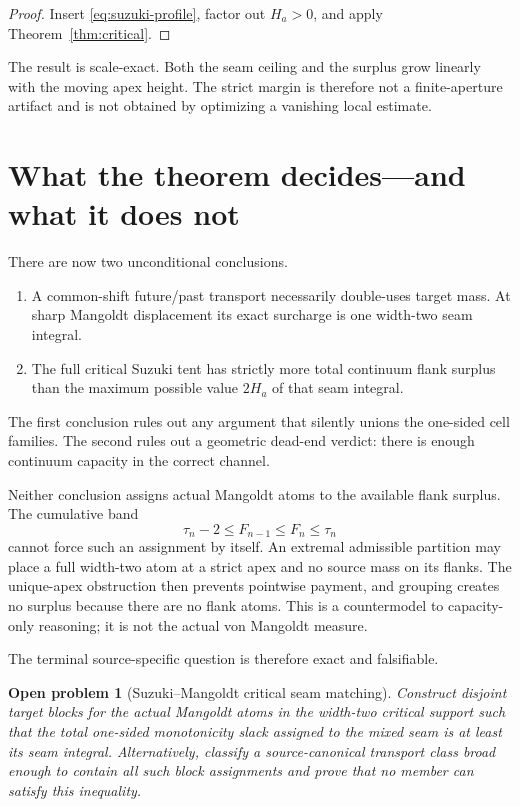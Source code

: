 \documentclass[11pt]{article}
\newtheorem{problem}[theorem]{Open problem}
\begin{document}
\begin{proof}
Insert \eqref{eq:suzuki-profile}, factor out $H_a>0$, and apply
Theorem~\ref{thm:critical}.
\end{proof}

The result is scale-exact.  Both the seam ceiling and the surplus grow linearly with the moving
apex height.  The strict margin is therefore not a finite-aperture artifact and is not obtained by
optimizing a vanishing local estimate.

\section{What the theorem decides---and what it does not}

There are now two unconditional conclusions.

\begin{enumerate}
\item A common-shift future/past transport necessarily double-uses target mass.  At sharp
Mangoldt displacement its exact surcharge is one width-two seam integral.
\item The full critical Suzuki tent has strictly more total continuum flank surplus than the
maximum possible value $2H_a$ of that seam integral.
\end{enumerate}

The first conclusion rules out any argument that silently unions the one-sided cell families.
The second rules out a geometric dead-end verdict: there is enough continuum capacity in the
correct channel.

Neither conclusion assigns actual Mangoldt atoms to the available flank surplus.  The cumulative
band
\[
 \tau_n-2\le F_{n-1}\le F_n\le\tau_n
\]
cannot force such an assignment by itself.  An extremal admissible partition may place a full
width-two atom at a strict apex and no source mass on its flanks.  The unique-apex obstruction then
prevents pointwise payment, and grouping creates no surplus because there are no flank atoms.  This
is a countermodel to capacity-only reasoning; it is not the actual von Mangoldt measure.

The terminal source-specific question is therefore exact and falsifiable.

\begin{problem}[Suzuki--Mangoldt critical seam matching]\label{prob:matching}
Construct disjoint target blocks for the actual Mangoldt atoms in the width-two critical support
such that the total one-sided monotonicity slack assigned to the mixed seam is at least its seam
integral.  Alternatively, classify a source-canonical transport class broad enough to contain all
such block assignments and prove that no member can satisfy this inequality.
\end{problem}
\end{document}
